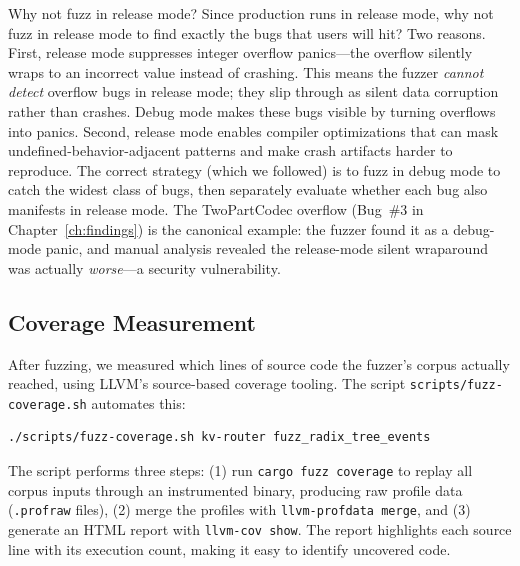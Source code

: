 \begin{whynotbox}{Why not fuzz in release mode?}
Since production runs in release mode, why not fuzz in release mode to find exactly the bugs that users will hit? Two reasons. First, release mode suppresses integer overflow panics---the overflow silently wraps to an incorrect value instead of crashing. This means the fuzzer \emph{cannot detect} overflow bugs in release mode; they slip through as silent data corruption rather than crashes. Debug mode makes these bugs visible by turning overflows into panics. Second, release mode enables compiler optimizations that can mask undefined-behavior-adjacent patterns and make crash artifacts harder to reproduce. The correct strategy (which we followed) is to fuzz in debug mode to catch the widest class of bugs, then separately evaluate whether each bug also manifests in release mode. The TwoPartCodec overflow (Bug~\#3 in Chapter~\ref{ch:findings}) is the canonical example: the fuzzer found it as a debug-mode panic, and manual analysis revealed the release-mode silent wraparound was actually \emph{worse}---a security vulnerability.
\end{whynotbox}

\subsection{Coverage Measurement}

After fuzzing, we measured which lines of source code the fuzzer's corpus actually reached, using LLVM's source-based coverage tooling. The script \texttt{scripts/fuzz-coverage.sh} automates this:

\begin{lstlisting}[language=bash,caption={Generating a coverage report for a single target.}]
./scripts/fuzz-coverage.sh kv-router fuzz_radix_tree_events
\end{lstlisting}

The script performs three steps: (1) run \texttt{cargo fuzz coverage} to replay all corpus inputs through an instrumented binary, producing raw profile data (\texttt{.profraw} files), (2) merge the profiles with \texttt{llvm-profdata merge}, and (3) generate an HTML report with \texttt{llvm-cov show}. The report highlights each source line with its execution count, making it easy to identify uncovered code.

